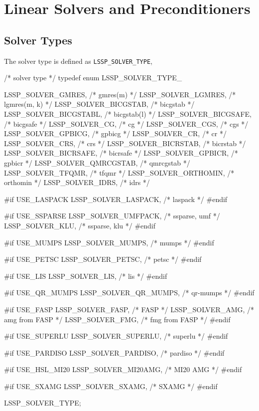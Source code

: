 \chapter{Linear Solvers and Preconditioners}

\section{Solver Types}
The solver type is defined as \verb|LSSP_SOLVER_TYPE|,

\begin{evb}
/* solver type */
typedef enum LSSP_SOLVER_TYPE_
{
    LSSP_SOLVER_GMRES,     /* gmres(m) */
    LSSP_SOLVER_LGMRES,    /* lgmres(m, k) */
    LSSP_SOLVER_BICGSTAB,  /* bicgstab */
    LSSP_SOLVER_BICGSTABL, /* bicgstab(l) */
    LSSP_SOLVER_BICGSAFE,  /* bicgsafe */
    LSSP_SOLVER_CG,        /* cg */
    LSSP_SOLVER_CGS,       /* cgs */
    LSSP_SOLVER_GPBICG,    /* gpbicg */
    LSSP_SOLVER_CR,        /* cr */
    LSSP_SOLVER_CRS,       /* crs */
    LSSP_SOLVER_BICRSTAB,  /* bicrstab */
    LSSP_SOLVER_BICRSAFE,  /* bicrsafe */
    LSSP_SOLVER_GPBICR,    /* gpbicr */
    LSSP_SOLVER_QMRCGSTAB, /* qmrcgstab */
    LSSP_SOLVER_TFQMR,     /* tfqmr */
    LSSP_SOLVER_ORTHOMIN,  /* orthomin */
    LSSP_SOLVER_IDRS,      /* idrs */

#if USE_LASPACK
    LSSP_SOLVER_LASPACK,   /* laspack */
#endif

#if USE_SSPARSE
    LSSP_SOLVER_UMFPACK,   /* ssparse, umf */
    LSSP_SOLVER_KLU,       /* ssparse, klu */
#endif

#if USE_MUMPS
    LSSP_SOLVER_MUMPS,     /* mumps */
#endif

#if USE_PETSC
    LSSP_SOLVER_PETSC,     /* petsc */
#endif

#if USE_LIS
    LSSP_SOLVER_LIS,       /* lis */
#endif

#if USE_QR_MUMPS
    LSSP_SOLVER_QR_MUMPS,  /* qr-mumps */
#endif

#if USE_FASP
    LSSP_SOLVER_FASP,      /* FASP */
    LSSP_SOLVER_AMG,       /* amg from FASP */
    LSSP_SOLVER_FMG,       /* fmg from FASP */
#endif

#if USE_SUPERLU
    LSSP_SOLVER_SUPERLU,   /* superlu */
#endif

#if USE_PARDISO
    LSSP_SOLVER_PARDISO,   /* pardiso */
#endif

#if USE_HSL_MI20
    LSSP_SOLVER_MI20AMG,   /* MI20 AMG */
#endif

#if USE_SXAMG
    LSSP_SOLVER_SXAMG,     /* SXAMG */
#endif

} LSSP_SOLVER_TYPE;
\end{evb}

